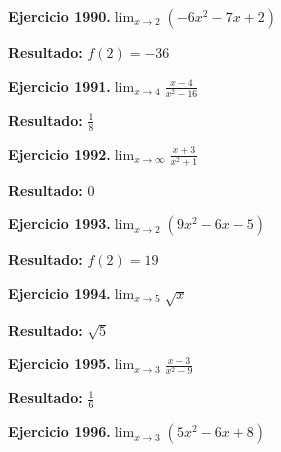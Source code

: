 \documentclass[10pt,a4paper]{article}
\begin{document}
\newpage
\begin{ejbox}
\textbf{Ejercicio 1990.}\quad $\lim_{x\to 2} (-6x^2 -7x +2)$
\end{ejbox}

\begin{solbox}
\textbf{Resultado:} \(\displaystyle f(2) = -36\)
\end{solbox}

\begin{ejbox}
\textbf{Ejercicio 1991.}\quad $\lim_{x\to 4} \frac{x-4}{x^2-16}$
\end{ejbox}

\begin{solbox}
\textbf{Resultado:} \(\displaystyle \frac{1}{8}\)
\end{solbox}

\begin{ejbox}
\textbf{Ejercicio 1992.}\quad $\lim_{x\to \infty} \frac{x + 3}{x^2 + 1}$
\end{ejbox}

\begin{solbox}
\textbf{Resultado:} \(\displaystyle 0\)
\end{solbox}

\newpage
\begin{ejbox}
\textbf{Ejercicio 1993.}\quad $\lim_{x\to 2} (9x^2 -6x -5)$
\end{ejbox}

\begin{solbox}
\textbf{Resultado:} \(\displaystyle f(2) = 19\)
\end{solbox}

\begin{ejbox}
\textbf{Ejercicio 1994.}\quad $\lim_{x\to 5} \sqrt{x}$
\end{ejbox}

\begin{solbox}
\textbf{Resultado:} \(\displaystyle \sqrt{5}\)
\end{solbox}

\begin{ejbox}
\textbf{Ejercicio 1995.}\quad $\lim_{x\to 3} \frac{x-3}{x^2-9}$
\end{ejbox}

\begin{solbox}
\textbf{Resultado:} \(\displaystyle \frac{1}{6}\)
\end{solbox}

\newpage
\begin{ejbox}
\textbf{Ejercicio 1996.}\quad $\lim_{x\to 3} (5x^2 -6x +8)$
\end{ejbox}
\end{document}
